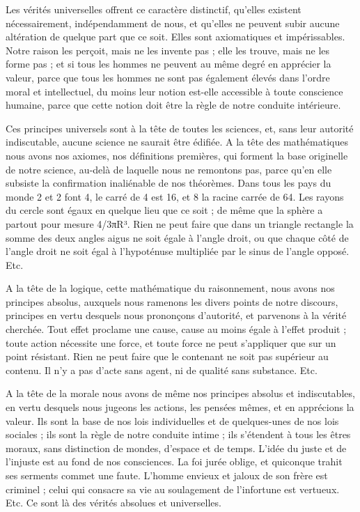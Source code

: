 \documentclass[a4paper, 11pt, oneside, landscape]{article}
\begin{document}
Les vérités universelles offrent ce caractère distinctif, qu'elles existent nécessairement, indépendamment de nous, et qu'elles ne peuvent subir aucune altération de quelque part que ce soit. Elles sont axiomatiques et impérissables. Notre raison les perçoit, mais ne les invente pas ; elle les trouve, mais ne les forme pas ; et si tous les hommes ne peuvent au même degré en apprécier la valeur, parce que tous les hommes ne sont pas également élevés dans l'ordre moral et intellectuel, du moins leur notion est-elle accessible à toute conscience humaine, parce que cette notion doit être la règle de notre conduite intérieure.

Ces principes universels sont à la tête de toutes les sciences, et, sans leur autorité indiscutable, aucune science ne saurait être édifiée. A la tête des mathématiques nous avons nos axiomes, nos définitions premières, qui forment la base originelle de notre science, au-delà de laquelle nous ne remontons pas, parce qu'en elle subsiste la confirmation inaliénable de nos théorèmes. Dans tous les pays du monde 2 et 2 font 4, le carré de 4 est 16, et 8 la racine carrée de 64. Les rayons du cercle sont égaux en quelque lieu que ce soit ; de même que la sphère a partout pour mesure 4/3πR³. Rien ne peut faire que dans un triangle rectangle la somme des deux angles aigus ne soit égale à l'angle droit, ou que chaque côté de l'angle droit ne soit égal à l'hypoténuse multipliée par le sinus de l'angle opposé. Etc.

A la tête de la logique, cette mathématique du raisonnement, nous avons nos principes absolus, auxquels nous ramenons les divers points de notre discours, principes en vertu desquels nous prononçons d'autorité, et parvenons à la vérité cherchée. Tout effet proclame une cause, cause au moins égale à l'effet produit ; toute action nécessite une force, et toute force ne peut s'appliquer que sur un point résistant. Rien ne peut faire que le contenant ne soit pas supérieur au contenu. Il n'y a pas d'acte sans agent, ni de qualité sans substance. Etc.

A la tête de la morale nous avons de même nos principes absolus et indiscutables, en vertu desquels nous jugeons les actions, les pensées mêmes, et en apprécions la valeur. Ils sont la base de nos lois individuelles et de quelques-unes de nos lois sociales ; ils sont la règle de notre conduite intime ; ils s'étendent à tous les êtres moraux, sans distinction de mondes, d'espace et de temps. L'idée du juste et de l'injuste est au fond de nos consciences. La foi jurée oblige, et quiconque trahit ses serments commet une faute. L'homme envieux et jaloux de son frère est criminel ; celui qui consacre sa vie au soulagement de l'infortune est vertueux. Etc. Ce sont là des vérités absolues et universelles.
\end{document}
